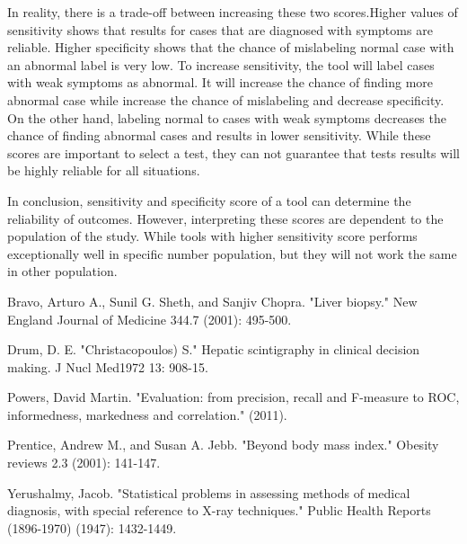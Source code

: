 \documentclass[12pt]{article}
\begin{document}
In reality, there is a trade-off between increasing these two scores.Higher values of sensitivity shows that results for cases that are diagnosed with symptoms are reliable. Higher specificity shows that the chance of mislabeling normal case with an abnormal label is very low. To increase sensitivity, the tool will label cases with weak symptoms as abnormal. It will increase the chance of finding more abnormal case while increase the chance of mislabeling and decrease specificity. On the other hand, labeling normal to cases with weak symptoms decreases the chance of finding abnormal cases and results in lower sensitivity.
While these scores are important to select a test, they can not guarantee that tests results will be highly reliable for all situations. 

In conclusion, sensitivity and specificity score of a tool can determine the reliability of outcomes. However, interpreting these scores are dependent to the population of the study. While tools with higher sensitivity score  performs exceptionally well in specific number  population, but they will not work the same in other population.


\begin{thebibliography}{1}
Bravo, Arturo A., Sunil G. Sheth, and Sanjiv Chopra. "Liver biopsy." New England Journal of Medicine 344.7 (2001): 495-500.

Drum, D. E. "Christacopoulos) S." Hepatic scintigraphy in clinical decision making. J Nucl Med1972 13: 908-15.

Powers, David Martin. "Evaluation: from precision, recall and F-measure to ROC, informedness, markedness and correlation." (2011).

Prentice, Andrew M., and Susan A. Jebb. "Beyond body mass index." Obesity reviews 2.3 (2001): 141-147.

Yerushalmy, Jacob. "Statistical problems in assessing methods of medical diagnosis, with special reference to X-ray techniques." Public Health Reports (1896-1970) (1947): 1432-1449.




\end{thebibliography}
\smallskip
\end{document}
